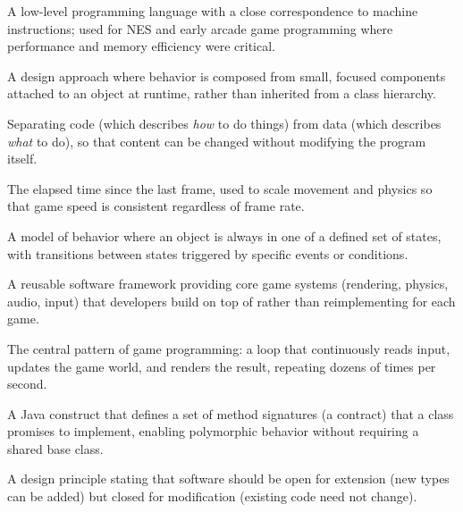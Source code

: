 \documentclass[11pt,letterpaper]{article}
\begin{document}
\begin{glossarybox}
\begin{description}[leftmargin=!, labelwidth=3.6cm, font=\bfseries\color{cssecondary}]
    \item[Assembly Language] A low-level programming language with a close correspondence to machine instructions; used for NES and early arcade game programming where performance and memory efficiency were critical.

    \item[Component Pattern] A design approach where behavior is composed from small, focused components attached to an object at runtime, rather than inherited from a class hierarchy.

    \item[Data-Driven Design] Separating code (which describes \textit{how} to do things) from data (which describes \textit{what} to do), so that content can be changed without modifying the program itself.

    \item[Delta Time] The elapsed time since the last frame, used to scale movement and physics so that game speed is consistent regardless of frame rate.

    \item[Finite State Machine] A model of behavior where an object is always in one of a defined set of states, with transitions between states triggered by specific events or conditions.

    \item[Game Engine] A reusable software framework providing core game systems (rendering, physics, audio, input) that developers build on top of rather than reimplementing for each game.

    \item[Game Loop] The central pattern of game programming: a loop that continuously reads input, updates the game world, and renders the result, repeating dozens of times per second.

    \item[Interface] A Java construct that defines a set of method signatures (a contract) that a class promises to implement, enabling polymorphic behavior without requiring a shared base class.

    \item[Open/Closed Principle] A design principle stating that software should be open for extension (new types can be added) but closed for modification (existing code need not change).


\end{description}
\end{glossarybox}
\end{document}
